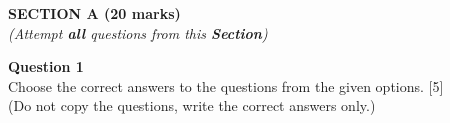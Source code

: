 \begin{center}
   \large
   \textbf{SECTION A (20 marks)}\\
   \vspace{5mm}
   \normalsize
   \textit{(Attempt \textbf{all} questions from this \textbf{Section})}
\end{center}
\par
\noindent
\textbf{Question 1}\\
Choose the correct answers to the questions from the given options. \hfill [5]\\
(Do not copy the questions, write the correct answers only.)
\par
\vspace{2mm}
